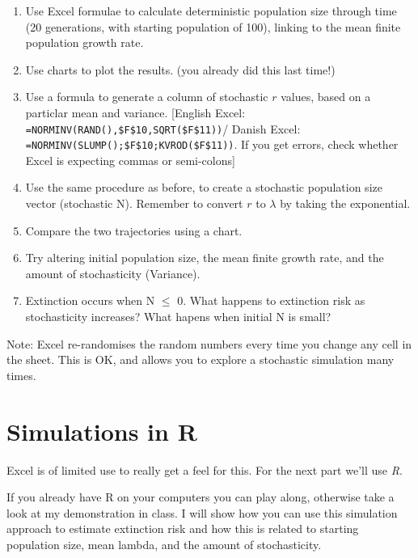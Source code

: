 \documentclass[
  a4paper]{book}
\providecommand{\tightlist}{%
  \setlength{\itemsep}{0pt}\setlength{\parskip}{0pt}}
\begin{document}
\begin{enumerate}
\def\labelenumi{\arabic{enumi})}
\tightlist
\item
  Use Excel formulae to calculate deterministic population size through
  time (20 generations, with starting population of 100), linking to the
  mean finite population growth rate.
\item
  Use charts to plot the results. (you already did this last time!)
\item
  Use a formula to generate a column of stochastic \(r\) values, based
  on a particlar mean and variance. {[}English Excel:
  \texttt{=NORMINV(RAND(),\$F\$10,SQRT(\$F\$11))}/ Danish Excel:
  \texttt{=NORMINV(SLUMP();\$F\$10;KVROD(\$F\$11))}. If you get errors,
  check whether Excel is expecting commas or semi-colons{]}
\item
  Use the same procedure as before, to create a stochastic population
  size vector (stochastic N). Remember to convert \(r\) to \(\lambda\)
  by taking the exponential.
\item
  Compare the two trajectories using a chart.
\item
  Try altering initial population size, the mean finite growth rate, and
  the amount of stochasticity (Variance).
\item
  Extinction occurs when N \(\leq\) 0. What happens to extinction risk
  as stochasticity increases? What hapens when initial N is small?
\end{enumerate}

\begin{do-something}
Note: Excel re-randomises the random numbers every time you change any
cell in the sheet. This is OK, and allows you to explore a stochastic
simulation many times.
\end{do-something}

\hypertarget{simulations-in-r}{%
\section{Simulations in R}\label{simulations-in-r}}

Excel is of limited use to really get a feel for this. For the next part
we'll use \emph{R}.

If you already have R on your computers you can play along, otherwise
take a look at my demonstration in class. I will show how you can use
this simulation approach to estimate extinction risk and how this is
related to starting population size, mean lambda, and the amount of
stochasticity.
\end{document}
